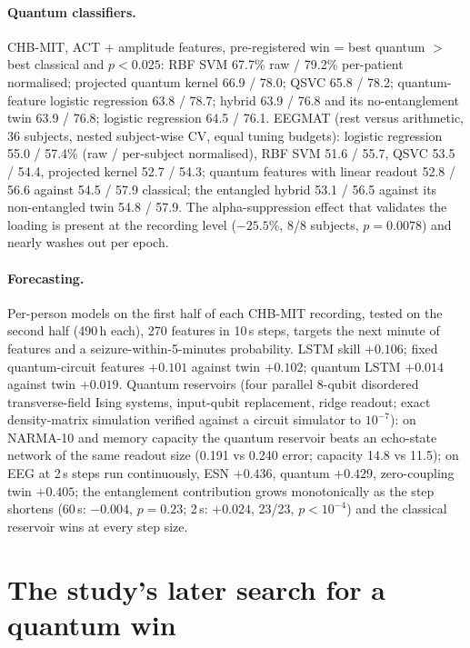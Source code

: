 \documentclass{article}
\begin{document}
\paragraph{Quantum classifiers.} CHB-MIT, ACT + amplitude features, pre-registered win = best quantum $>$ best classical and $p<0.025$: RBF SVM 67.7\% raw / 79.2\% per-patient normalised; projected quantum kernel 66.9 / 78.0; QSVC 65.8 / 78.2; quantum-feature logistic regression 63.8 / 78.7; hybrid 63.9 / 76.8 and its no-entanglement twin 63.9 / 76.8; logistic regression 64.5 / 76.1. EEGMAT (rest versus arithmetic, 36 subjects, nested subject-wise CV, equal tuning budgets): logistic regression 55.0 / 57.4\% (raw / per-subject normalised), RBF SVM 51.6 / 55.7, QSVC 53.5 / 54.4, projected kernel 52.7 / 54.3; quantum features with linear readout 52.8 / 56.6 against 54.5 / 57.9 classical; the entangled hybrid 53.1 / 56.5 against its non-entangled twin 54.8 / 57.9. The alpha-suppression effect that validates the loading is present at the recording level ($-25.5\%$, 8/8 subjects, $p=0.0078$) and nearly washes out per epoch.

\paragraph{Forecasting.} Per-person models on the first half of each CHB-MIT recording, tested on the second half (490\,h each), 270 features in 10\,s steps, targets the next minute of features and a seizure-within-5-minutes probability. LSTM skill $+0.106$; fixed quantum-circuit features $+0.101$ against twin $+0.102$; quantum LSTM $+0.014$ against twin $+0.019$. Quantum reservoirs (four parallel 8-qubit disordered transverse-field Ising systems, input-qubit replacement, ridge readout; exact density-matrix simulation verified against a circuit simulator to $10^{-7}$): on NARMA-10 and memory capacity the quantum reservoir beats an echo-state network of the same readout size (0.191 vs 0.240 error; capacity 14.8 vs 11.5); on EEG at 2\,s steps run continuously, ESN $+0.436$, quantum $+0.429$, zero-coupling twin $+0.405$; the entanglement contribution grows monotonically as the step shortens (60\,s: $-0.004$, $p=0.23$; 2\,s: $+0.024$, 23/23, $p<10^{-4}$) and the classical reservoir wins at every step size.

\section{The study's later search for a quantum win}
\label{app:search}
\end{document}
